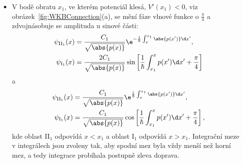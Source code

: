 \begin{itemize}
\item
    V bodě obratu $x_{1}$, ve kterém potenciál klesá, $V'(x_{1})<0$, viz obrázek~\ref{fig:WKBConnection}(a), se mění fáze vlnové funkce o $\frac{\pi}{4}$ a zdvojnásobuje se amplituda u sinové části:
    \begin{subequations}
        \begin{align}
            \psi_{\mathrm{II}_{1}}(x)&=\frac{C_{1}}{\sqrt{\abs{p(x)}}}\e^{-\frac{1}{\hbar}\int_{x}^{x_{1}}\abs{p(x')}\d x'},\\
            \psi_{\mathrm{I}_{1}}(x)&=\frac{2C_{1}}{\sqrt{\abs{p(x)}}}\sin\left[\frac{1}{\hbar}\int_{x_{1}}^{x}p(x')\d x'+\frac{\pi}{4}\right]
        \end{align}            
        \label{eq:WKBConnectionDown1}
    \end{subequations}
    a
    \begin{subequations}
        \begin{align}
            \psi_{\mathrm{II}_{1}}(x)&=\frac{C_{1}}{\sqrt{\abs{p(x)}}}\e^{\frac{1}{\hbar}\int_{x}^{x_{1}}\abs{p(x')}\d x'},\\
            \psi_{\mathrm{I}_{1}}(x)&=\frac{C_{1}}{\sqrt{\abs{p(x)}}}\cos\left[\frac{1}{\hbar}\int_{x_{1}}^{x}p(x')\d x'+\frac{\pi}{4}\right],
        \end{align}		            
        \label{eq:WKBConnectionDown2}
    \end{subequations}
    kde oblast II$_{1}$ odpovídá $x<x_{1}$ a oblast I$_{1}$ odpovídá $x>x_{1}$.
    Integrační meze v integrálech jsou zvoleny tak, aby spodní mez byla vždy menší než horní mez, a tedy integrace probíhala postupně zleva doprava.
    

\end{itemize}
